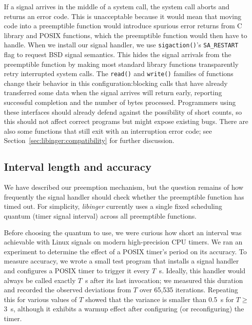 If a signal arrives in the middle of a system call, the system call aborts and
returns an error code.  This is unacceptable because it would mean that moving code
into a preemptible function would introduce spurious error returns from C library and
POSIX functions, which the preemptible function would then have to handle.  When we
install our signal handler, we use \texttt{sigaction()}'s \texttt{SA\_RESTART} flag
to request BSD signal semantics.  This hides the signal arrivals from the preemptible
function by making most standard library functions transparently retry interrupted
system calls.  The \texttt{read()} and \texttt{write()} families of functions change
their behavior in this configuration:\@ blocking calls that have already transferred
some data when the signal arrives will return early, reporting successful completion
and the number of bytes processed.  Programmers using these interfaces should already
defend against the possibility of short counts, so this should not affect correct
programs but might expose existing bugs.  There are also some functions that still
exit with an interruption error code; see Section~\ref{sec:libinger:compatibility}
for further discussion.


\subsection{Interval length and accuracy}
\label{sec:libinger:quantum}

We have described our preemption mechanism, but the question remains of how
frequently the signal handler should check whether the preemptible function has timed
out.  For simplicity, \textit{libinger} currently uses a single fixed scheduling
quantum (timer signal interval) across all preemptible functions.

Before choosing the quantum to use, we were curious how short an interval was
achievable with
Linux signals on modern high-precision CPU timers.  We ran an experiment to determine
the effect of a POSIX timer's period on its accuracy.  To measure accuracy, we wrote
a small test program that installs a signal handler and configures a POSIX timer to
trigger it every $T$~\textmu{}s.  Ideally, this handler would always be called
exactly $T$~\textmu{}s after its last invocation; we measured this duration and
recorded the observed deviations from $T$ over 65,535 iterations.  Repeating this
for various values of $T$ showed that the variance is smaller than 0.5~\textmu{}s for
$T \ge$ 3~\textmu{}s, although it exhibits a warmup effect after configuring (or
reconfiguring) the timer.

